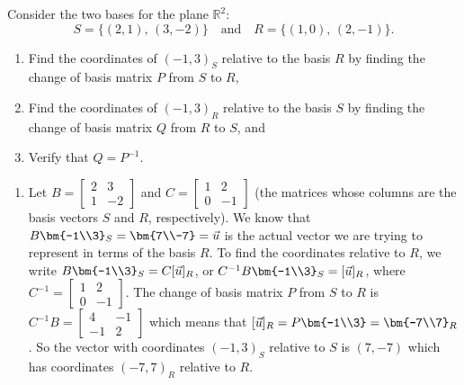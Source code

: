\begin{example}
Consider the two bases for the plane $\mathbb{R}^2$: $$S=\{(2,1),\,(3,-2)\}\quad \text{and}\quad R=\{(1,0),\,(2,-1)\}.$$ 
\begin{enumerate}
	\item Find the coordinates of $(-1,3)_S$ relative to the basis $R$ by finding the change of basis matrix $P$ from $S$ to $R$, 
	\item Find the coordinates of $(-1,3)_{R}$ relative to the basis $S$ by finding the change of basis matrix $Q$ from $R$ to $S$, and 
	\item Verify that $Q=P^{-1}$.
\end{enumerate}
\begin{enumerate}
	\item Let 
	$B=
\begin{bmatrix}
 2 & 3 \\
 1 & -2
\end{bmatrix}
$
and 
	$C=
\begin{bmatrix}
 1 & 2 \\
 0 & -1
\end{bmatrix}
$ (the matrices whose columns are the basis vectors $S$ and $R$, respectively).  We know that $B \bm{-1\\3}_S = \bm{7\\-7}=\vec u$ is the actual vector we are trying to represent in terms of the basis $R$.  To find the coordinates relative to $R$, we write $B \bm{-1\\3}_S = C[\vec u]_{R}$, or $C^{-1}B \bm{-1\\3}_S= [\vec u]_{R}$, where 
$C^{-1} = 
\begin{bmatrix}
 1 & 2 \\
 0 & -1
\end{bmatrix}
$. 
The change of basis matrix $P$ from $S$ to $R$ is 
$C^{-1}B =  
\begin{bmatrix}
 4 & -1 \\
 -1 & 2
\end{bmatrix}
$ which means that $[\vec u]_{R}= P\bm{-1\\3} = \bm{-7\\7}_{R}$. So the vector with coordinates $(-1,3)_S$ relative to $S$ is $(7,-7)$ which has coordinates $(-7,7)_{R}$ relative to $R$.


\end{enumerate}
\end{example}
